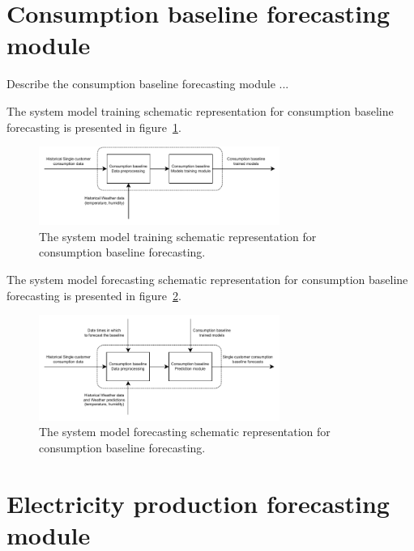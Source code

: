 \section{Consumption baseline forecasting module}
\label{sec:baselinemodel}
\vspace{0.2 cm}

Describe the consumption baseline forecasting module ...

The system model training schematic representation for consumption baseline forecasting is presented in figure~\ref{fig:modeltrainingbaseline}.

\begin{figure}[H]
\centering
\includegraphics[width=0.7\textwidth]{images/system_model_training_baseline}
\caption{The system model training schematic representation for consumption baseline forecasting.}
\label{fig:modeltrainingbaseline}
\end{figure}

The system model forecasting schematic representation for consumption baseline forecasting is presented in figure~\ref{fig:modelforecastingbaseline}.

\begin{figure}[H]
\centering
\includegraphics[width=0.7\textwidth]{images/system_model_forecasting_baseline}
\caption{The system model forecasting schematic representation for consumption baseline forecasting.}
\label{fig:modelforecastingbaseline}
\end{figure}


\section{Electricity production forecasting module}
\label{sec:productionmodel}
\vspace{0.2 cm}

